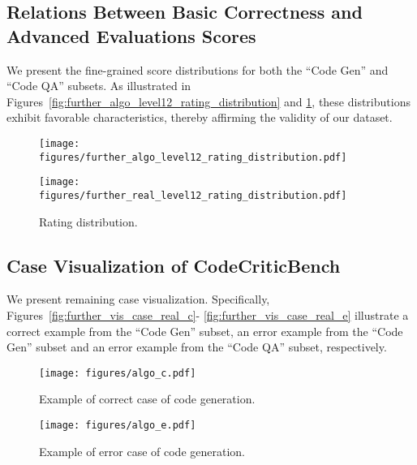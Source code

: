 \documentclass[11pt, a4paper, logo, copyright, nonumbering, amsart]{map}
\begin{document}
\begin{CJK*}{UTF8}{gbsn}
\subsection{Relations Between Basic Correctness and Advanced Evaluations Scores} \label{ap:rating_level12}

We present the fine-grained score distributions for both the ``Code Gen'' and ``Code QA'' subsets. As illustrated in Figures~\ref{fig:further_algo_level12_rating_distribution} and \ref{fig:further_real_level12_rating_distribution}, these distributions exhibit favorable characteristics, thereby affirming the validity of our dataset.

\begin{figure}[h]
    \centering

    \begin{minipage}[c]{0.45\textwidth}
        \centering
        \texttt{[image: figures/further\_algo\_level12\_rating\_distribution.pdf]}
        \label{fig:further_algo_level12_rating_distribution}
    \end{minipage}
    \begin{minipage}[c]{0.45\textwidth}
        \centering
        \texttt{[image: figures/further\_real\_level12\_rating\_distribution.pdf]}
        \label{fig:further_real_level12_rating_distribution}
    \end{minipage}
    \caption{Rating distribution.}
\end{figure}

\subsection{Case Visualization of CodeCriticBench} \label{ap:case}

We present remaining case visualization. Specifically, Figures~\ref{fig:further_vis_case_real_c}- \ref{fig:further_vis_case_real_e} illustrate a correct example from the ``Code Gen'' subset, an error example from the ``Code Gen'' subset and an error example from the ``Code QA'' subset, respectively.

\begin{figure}[h!]
    \centering
    \texttt{[image: figures/algo\_c.pdf]}
    \caption{Example of correct case of code generation.} \label{fig:further_vis_case_algo_c}
\end{figure}

\begin{figure}[h!]
    \centering
    \texttt{[image: figures/algo\_e.pdf]}
    \caption{Example of error case of code generation.} \label{fig:further_vis_case_algo_e}
\end{figure}


\end{CJK*}
\end{document}
